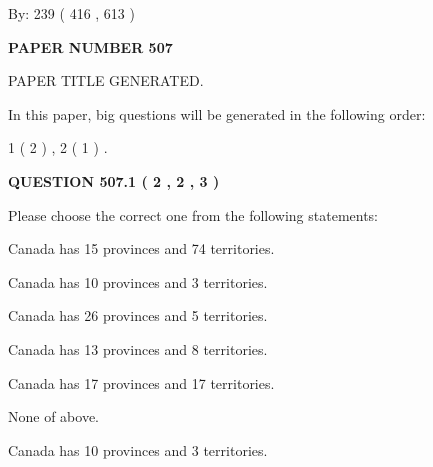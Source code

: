 \documentclass[12pt]{article}
\begin{document}
   
\hspace{1.0in} By: 
 239 ( 416 ,  613 )
   
   
   
   
\newpage 
\setcounter{page}{ 
   507001 } 
   
   
   
   
 {\textbf{ \Large{ PAPER NUMBER  507  }}}
   
   
\vspace{0.2in}
   
   
   
   
   
   
   
   
 \vspace{0.2in}
 
 
 
 
   
   
 PAPER TITLE GENERATED.
   
   
   
\vspace{0.2in}
   
In this paper, big questions will be generated in the following order: 
   
   
   1 ( 2 )
 ,
   2 ( 1 )
 .
  
\vspace{0.2in}
  
{\textbf{\Large{QUESTION
507.1 
 ( 2 , 2 , 3 )
}}}
  
  
Please choose the correct one from the following statements:
 
 
Canada has  15 provinces and  74 territories.
 
 
Canada has 10  provinces and 3 territories.
 
 
Canada has  26 provinces and  5 territories.
 
 
Canada has  13 provinces and  8 territories.
 
 
Canada has  17 provinces and  17 territories.
 
 
 None of above.
 
 
\noindent{}
 
 
Canada has 10  provinces and 3 territories.
 
\end{document}
